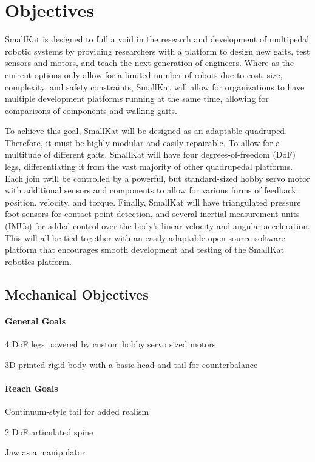 \section{Objectives}
SmallKat is designed to full a void in the research and development of multipedal robotic systems by providing researchers with a platform to design new gaits, test sensors and motors, and teach the next generation of engineers. Where-as the current options only allow for a limited number of robots due to cost,  size, complexity, and safety constraints, SmallKat will allow for organizations to have multiple development platforms running at  the  same time,  allowing  for comparisons of components and walking gaits.

To achieve this goal, SmallKat will be designed as an adaptable quadruped. Therefore, it must be highly modular and easily repairable. To allow for a multitude of different gaits, SmallKat will have four degrees-of-freedom (DoF) legs, differentiating it from the vast majority of other quadrupedal platforms. Each join twill be controlled by a powerful, but standard-sized hobby servo motor with additional sensors and components to allow for various forms of feedback: position, velocity, and torque. Finally, SmallKat will have triangulated pressure foot sensors for contact point detection, and several inertial measurement units (IMUs) for added control over the body's linear velocity and angular acceleration. This will all be tied together with an easily adaptable open source software platform that encourages smooth development and testing of the SmallKat robotics platform.


\subsection*{Mechanical Objectives}
\paragraph*{General Goals}
\begin{Deliverables}
    \item 4 DoF legs powered by custom hobby servo sized motors
    \item 3D-printed rigid body with a basic head and tail for counterbalance
\end{Deliverables}
\paragraph*{Reach Goals}
\begin{Deliverables}
    \item Continuum-style tail for added realism
    \item 2 DoF articulated spine
    \item Jaw as a manipulator
\end{Deliverables}

